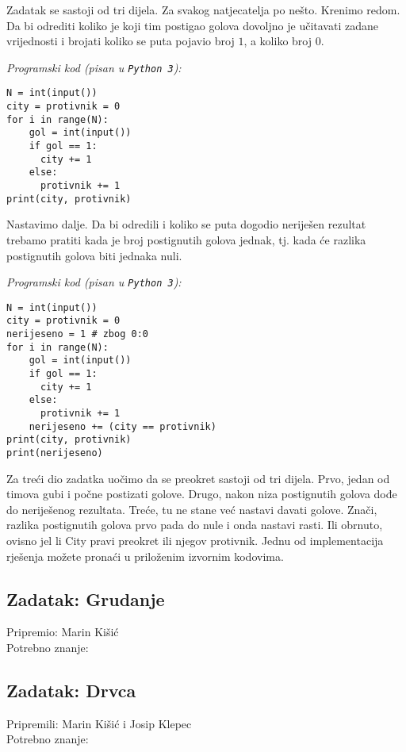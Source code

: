 \documentclass[a4paper]{article}
\begin{document}
Zadatak se sastoji od tri dijela. Za svakog natjecatelja po nešto.  Krenimo
redom. Da bi odrediti koliko je koji tim postigao golova dovoljno je učitavati
zadane vrijednosti i brojati koliko se puta pojavio broj $1$, a koliko broj $0$.

\textit{Programski kod (pisan u \texttt{Python 3}):}

\vspace{-2ex}
\begin{verbatim}
N = int(input())
city = protivnik = 0
for i in range(N):
    gol = int(input())
    if gol == 1:
      city += 1
    else:
      protivnik += 1
print(city, protivnik)
\end{verbatim}

Nastavimo dalje. Da bi odredili i koliko se puta dogodio neriješen rezultat
trebamo pratiti kada je broj postignutih golova jednak, tj. kada će razlika
postignutih golova biti jednaka nuli.

\textit{Programski kod (pisan u \texttt{Python 3}):}

\vspace{-2ex}
\begin{verbatim}
N = int(input())
city = protivnik = 0
nerijeseno = 1 # zbog 0:0
for i in range(N):
    gol = int(input())
    if gol == 1:
      city += 1
    else:
      protivnik += 1
    nerijeseno += (city == protivnik)
print(city, protivnik)
print(nerijeseno)
\end{verbatim}

Za treći dio zadatka uočimo da se preokret sastoji od tri dijela. Prvo, jedan
od timova gubi i počne postizati golove. Drugo, nakon niza postignutih golova
dođe do neriješenog rezultata. Treće, tu ne stane već nastavi davati golove.
Znači, razlika postignutih golova prvo pada do nule i onda nastavi rasti. Ili
obrnuto, ovisno jel li City pravi preokret ili njegov protivnik. Jednu od
implementacija rješenja možete pronaći u priloženim izvornim kodovima.

\subsection*{Zadatak: Grudanje}
\textsf{Pripremio: Marin Kišić}\\
\textsf{Potrebno znanje: }

\subsection*{Zadatak: Drvca}
\textsf{Pripremili: Marin Kišić i Josip Klepec}\\
\textsf{Potrebno znanje: }
\end{document}
